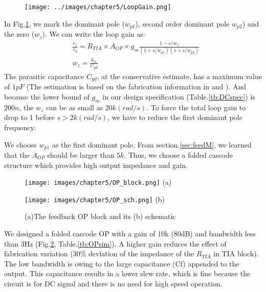 {\begin{figure}[!htbp]
    \centering
        \texttt{[image: ../images/chapter5/LoopGain.png]}
    \caption{}
    \label{fig:loopgain}
\end{figure}

In Fig.\ref{fig:loopgain}, we mark the dominant pole ($w_{p1}$), second order dominant pole $w_{p2}$) and the zero ($w_z$).
We can write the loop gain as:
\begin{align}
    & \frac{v_f}{v_g} =  R_{TIA} \times A_{OP} \times g_m \frac{1 - s/w_z}{(1 + s/w_{p1})(1 + s/w_{p2})} \\
    & w_z = \frac{g_m}{C_{gd}}
\end{align}
The parasitic capacitance $C_{gd}$, at the conservative estimate, has a maximum value of $1pF$ (The estimation is based on the fabrication information in \cite{DN17} and \cite{C6}).
And because the lower bound of $g_m$ in our design specification (Table.\ref{tb:DCspec}) is $200n$, the $w_z$ can be as small as $20k (rad/s)$.
To force the total loop gain to drop to 1 before $s > 2k (rad/s)$, we have to reduce the first dominant pole frequency.

We choose $w_{p1}$ as the first dominant pole.
From section.\ref{sec:feedM}, we learned that the $A_{OP}$ should be larger than $5k$.
Thus, we choose a folded cascode structure which provides high output impedance and gain.

\begin{figure}[!htbp]
    \centering
    \begin{minipage}[t]{0.35\textwidth}
        \texttt{[image: images/chapter5/OP\_block.png]}
        \raggedleft
        (a)
    \end{minipage}
    \hfill
    \begin{minipage}[t]{0.6\textwidth}
        \texttt{[image: images/chapter5/OP\_sch.png]}
        \raggedleft
        (b)
    \end{minipage}
    \caption{(a)The feedback OP block and its (b) schematic}
    \label{fig:OP_sch}
\end{figure}

We designed a folded cascode OP with a gain of 10k (80dB) and bandwidth less than 3Hz (Fig.\ref{fig:OP_sch}, Table.\ref{tb:OPsim}).
A higher gain reduces the effect of fabrication variation (30\% deviation of the impedance of the $R_{TIA}$ in TIA block).
The low bandwidth is owing to the large capacitance (Cf) appended to the output.
This capacitance results in a lower slew rate, which is fine because the circuit is for DC signal and there is no need for high speed operation.

}
